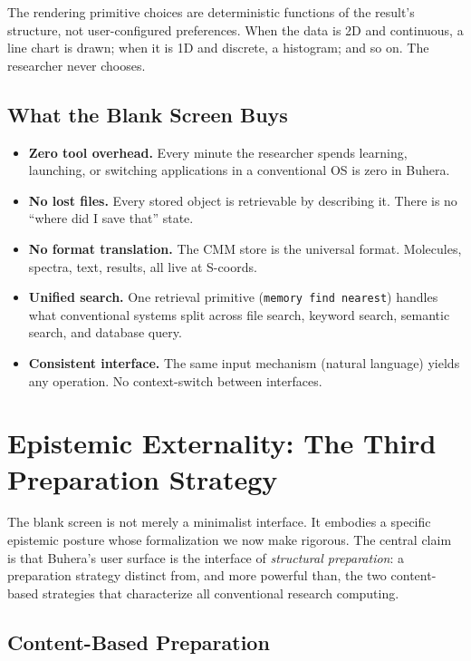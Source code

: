 \documentclass[11pt,twocolumn,a4paper]{article}
\begin{document}
The rendering primitive choices are deterministic functions of the result's structure, not user-configured preferences. When the data is 2D and continuous, a line chart is drawn; when it is 1D and discrete, a histogram; and so on. The researcher never chooses.

\subsection{What the Blank Screen Buys}

\begin{itemize}[leftmargin=*]
\item \textbf{Zero tool overhead.} Every minute the researcher spends learning, launching, or switching applications in a conventional OS is zero in Buhera.
\item \textbf{No lost files.} Every stored object is retrievable by describing it. There is no ``where did I save that'' state.
\item \textbf{No format translation.} The CMM store is the universal format. Molecules, spectra, text, results, all live at S-coords.
\item \textbf{Unified search.} One retrieval primitive (\texttt{memory find nearest}) handles what conventional systems split across file search, keyword search, semantic search, and database query.
\item \textbf{Consistent interface.} The same input mechanism (natural language) yields any operation. No context-switch between interfaces.
\end{itemize}


\section{Epistemic Externality: The Third Preparation Strategy}
\label{sec:epistemology}

The blank screen is not merely a minimalist interface. It embodies a specific epistemic posture whose formalization we now make rigorous. The central claim is that Buhera's user surface is the interface of \emph{structural preparation}: a preparation strategy distinct from, and more powerful than, the two content-based strategies that characterize all conventional research computing.

\subsection{Content-Based Preparation}
\end{document}
